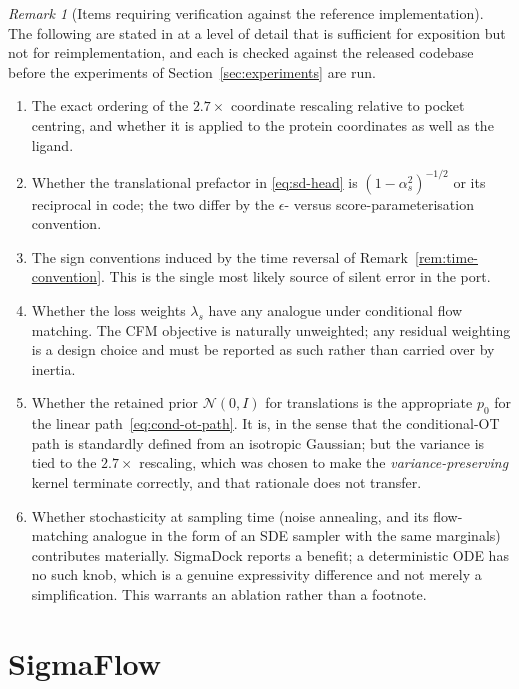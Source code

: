 \documentclass[a4paper,12pt]{article}
\theoremstyle{remark}
\newtheorem{remark}[theorem]{Remark}
\begin{document}
\begin{remark}[Items requiring verification against the reference implementation]
\label{rem:verification}
The following are stated in \cite{bortoliRiemannianScoreBasedGenerative2022} at a level of detail that is sufficient for
exposition but not for reimplementation, and each is checked against the released codebase before
the experiments of Section~\ref{sec:experiments} are run.
\begin{enumerate}[label=(\roman*)]
\item The exact ordering of the $2.7\times$ coordinate rescaling relative to pocket centring, and
      whether it is applied to the protein coordinates as well as the ligand.
\item Whether the translational prefactor in \eqref{eq:sd-head} is $(1-\alpha_s^2)^{-1/2}$ or its
      reciprocal in code; the two differ by the $\epsilon$- versus score-parameterisation convention.
\item The sign conventions induced by the time reversal of Remark~\ref{rem:time-convention}. This is
      the single most likely source of silent error in the port.
\item Whether the loss weights $\lambda_s$ have any analogue under conditional flow matching. The
      CFM objective is naturally unweighted; any residual weighting is a design choice and must be
      reported as such rather than carried over by inertia.
\item Whether the retained prior $\mathcal{N}(0,I)$ for translations is the appropriate $p_0$ for the
      linear path~\eqref{eq:cond-ot-path}. It is, in the sense that the conditional-OT path is
      standardly defined from an isotropic Gaussian; but the variance is tied to the $2.7\times$
      rescaling, which was chosen to make the \emph{variance-preserving} kernel terminate correctly,
      and that rationale does not transfer.
\item Whether stochasticity at sampling time (noise annealing, and its flow-matching analogue in the
      form of an SDE sampler with the same marginals) contributes materially. SigmaDock reports a
      benefit; a deterministic ODE has no such knob, which is a genuine expressivity difference and
      not merely a simplification. This warrants an ablation rather than a footnote.
\end{enumerate}
\end{remark}

\section{SigmaFlow}
\label{sec:SigmaFlow}
\end{document}
